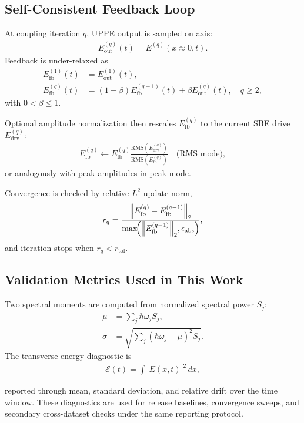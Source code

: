 \documentclass[aps,pra,twocolumn,reprint,superscriptaddress,nofootinbib]{revtex4-2}
\let\originalleft\left
\let\originalright\right
\renewcommand{\left}{\mathopen{}\mathclose\bgroup\originalleft}
\renewcommand{\right}{\aftergroup\egroup\originalright}
\begin{document}
\subsection{Self-Consistent Feedback Loop}
At coupling iteration $q$, UPPE output is sampled on axis:
\begin{align}
E_{\mathrm{out}}^{(q)}(t)=E^{(q)}(x\!\approx\!0,t).
\end{align}
Feedback is under-relaxed as
\begin{align}
E_{\mathrm{fb}}^{(1)}(t) &= E_{\mathrm{out}}^{(1)}(t),\\
E_{\mathrm{fb}}^{(q)}(t) &=
(1-\beta)E_{\mathrm{fb}}^{(q-1)}(t)+\beta E_{\mathrm{out}}^{(q)}(t), \quad q\ge2,
\end{align}
with $0<\beta\le1$.

Optional amplitude normalization then rescales $E_{\mathrm{fb}}^{(q)}$ to the
current SBE drive $E_{\mathrm{drv}}^{(q)}$:
\begin{align}
E_{\mathrm{fb}}^{(q)} \leftarrow
E_{\mathrm{fb}}^{(q)}
\frac{\mathrm{RMS}(E_{\mathrm{drv}}^{(q)})}{\mathrm{RMS}(E_{\mathrm{fb}}^{(q)})}
\quad \text{(RMS mode)},
\end{align}
or analogously with peak amplitudes in peak mode.

Convergence is checked by relative $L^2$ update norm,
\begin{align}
r_q=
\frac{\left\|E_{\mathrm{fb}}^{(q)}-E_{\mathrm{fb}}^{(q-1)}\right\|_2}
{\max\!\left(\left\|E_{\mathrm{fb}}^{(q-1)}\right\|_2,\epsilon_{\mathrm{abs}}\right)},
\end{align}
and iteration stops when $r_q<r_{\mathrm{tol}}$.

\subsection{Validation Metrics Used in This Work}
Two spectral moments are computed from normalized spectral power $S_j$:
\begin{align}
\mu &= \sum_j \hbar\omega_j S_j, \\
\sigma &= \sqrt{\sum_j (\hbar\omega_j-\mu)^2 S_j}.
\end{align}
The transverse energy diagnostic is
\begin{align}
\mathcal{E}(t)=\int |E(x,t)|^2\,dx,
\end{align}

reported through mean, standard deviation, and relative drift over the time
window. These diagnostics are used for release baselines, convergence sweeps,
and secondary cross-dataset checks under the same reporting protocol.
\end{document}

